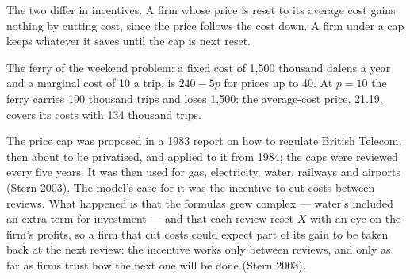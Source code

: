 The two differ in incentives. A firm whose price is reset to its average
cost gains nothing by cutting cost, since the price follows the cost down.
A firm under a cap keeps whatever it saves until the cap is next reset.

\begin{omfigure}

{\small The ferry of the weekend problem: a fixed cost of 1,500 thousand
dalens a year and a marginal cost of 10 a trip.  is
$240 - 5p$ for prices up to 40. At $p = 10$ the ferry carries 190 thousand trips
and loses 1,500; the average-cost price, 21.19, covers its costs with 134
thousand trips.}
\end{omfigure}

\begin{record}
The price cap was proposed in a 1983 report on how to regulate British
Telecom, then about to be privatised, and applied to it from 1984; the
caps were reviewed every five years. It was then used for gas,
electricity, water, railways and airports (Stern 2003). %
The model's case for it was the incentive to cut costs between reviews.
What happened is that the formulas grew complex --- water's included an
extra term for investment --- and that each review reset $X$ with an eye on
the firm's profits, so a firm that cut costs could expect part of its gain
to be taken back at the next review: the incentive works only between
reviews, and only as far as firms trust how the next one will be done
(Stern 2003). %
\end{record}

